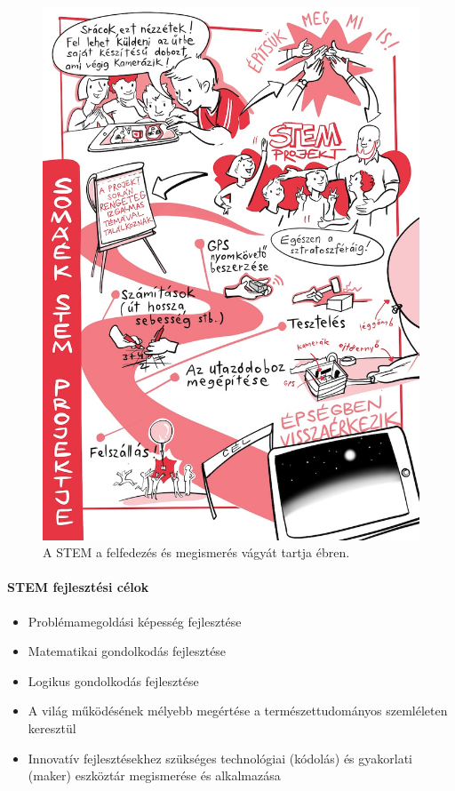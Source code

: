 \begin{figure}
\centering
\includegraphics{pics/2a_stem.jpg}
\caption{A STEM a felfedezés és megismerés vágyát tartja ébren.}
\end{figure}

\hypertarget{stem-fejlesztesi-celok}{%
\paragraph{STEM fejlesztési célok}\label{stem-fejlesztesi-celok}}

\begin{itemize}
\item
  Problémamegoldási képesség fejlesztése
\item
  Matematikai gondolkodás fejlesztése
\item
  Logikus gondolkodás fejlesztése
\item
  A világ működésének mélyebb megértése a természettudományos
  szemléleten keresztül
\item
  Innovatív fejlesztésekhez szükséges technológiai (kódolás) és
  gyakorlati (maker) eszköztár megismerése és alkalmazása
\end{itemize}

